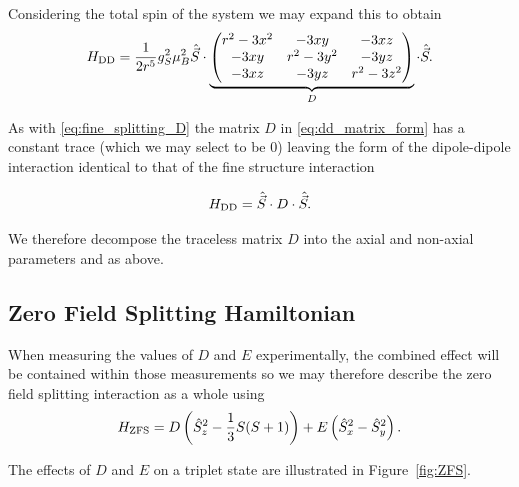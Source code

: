 Considering the total spin of the system we may expand this to obtain \cite{carrington1967introduction} 
\begin{equation}
    H_{\ce{DD}} = \frac{1}{2r^5}g_S^2 \mu_B^2 \hat{\vec{S}} \cdot
    \underbrace{
    \begin{pmatrix}
        {r^2 - 3x^2} & -3xy & - 3xz\\ 
        -3xy & r^2 - 3y^2 & -3yz \\ 
        -3xz & -3yz & r^2 - 3z^2 
    \end{pmatrix}
}_{D}
    \cdot \hat{\vec{S}}.
    \label{eq:dd_matrix_form}
\end{equation}

As with \eqref{eq:fine_splitting_D} the matrix $D$ in \eqref{eq:dd_matrix_form} has a constant trace (which we may select to be $0$) leaving the form of the dipole-dipole interaction identical to that of the fine structure interaction 

\begin{equation}
    H_{\ce{DD}} = \hat{\vec{S}} \cdot D \cdot \hat{\vec{S}}.
\end{equation}

We therefore decompose the traceless matrix $D$ into the axial and non-axial parameters  and  as above. 


\subsection{Zero Field Splitting Hamiltonian}
When measuring the values of $D$ and $E$ experimentally, the combined effect will be contained within those measurements so we may therefore describe the zero field splitting interaction as a whole using 
\begin{equation}
    H_{\ce{ZFS}} =D \left(\hat{S}_z^2 - \frac{1}{3}S(S+1)\right) + E\left(\hat{S}_x^2 - \hat{S}_y^2\right).
    \label{eq:ZFS_hamiltonian}
\end{equation}

The effects of $D$ and $E$ on a triplet state are illustrated in Figure~\ref{fig:ZFS}.


